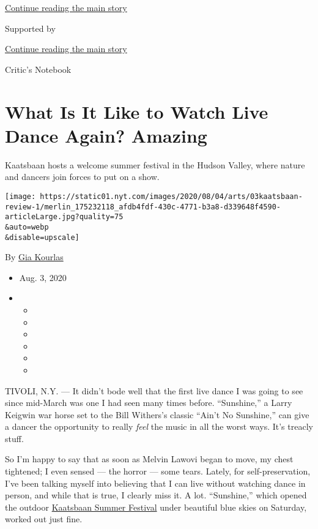 \protect\hyperlink{after-top}{Continue reading the main story}

Supported by

\protect\hyperlink{after-sponsor}{Continue reading the main story}

Critic's Notebook

\hypertarget{what-is-it-like-to-watch-live-dance-again-amazing}{%
\section{What Is It Like to Watch Live Dance Again?
Amazing}\label{what-is-it-like-to-watch-live-dance-again-amazing}}

Kaatsbaan hosts a welcome summer festival in the Hudson Valley, where
nature and dancers join forces to put on a show.

\texttt{[image: https://static01.nyt.com/images/2020/08/04/arts/03kaatsbaan-review-1/merlin\_175232118\_afdb4fdf-430c-4771-b3a8-d339648f4590-articleLarge.jpg?quality=75\\\&auto=webp\\\&disable=upscale]}

By \href{https://www.nytimes.com/by/gia-kourlas}{Gia Kourlas}

\begin{itemize}
\item
  Aug. 3, 2020
\item
  \begin{itemize}
  \item
  \item
  \item
  \item
  \item
  \item
  \end{itemize}
\end{itemize}

TIVOLI, N.Y. --- It didn't bode well that the first live dance I was
going to see since mid-March was one I had seen many times before.
``Sunshine,'' a Larry Keigwin war horse set to the Bill Withers's
classic ``Ain't No Sunshine,'' can give a dancer the opportunity to
really \emph{feel} the music in all the worst ways. It's treacly stuff.

So I'm happy to say that as soon as Melvin Lawovi began to move, my
chest tightened; I even sensed --- the horror --- some tears. Lately,
for self-preservation, I've been talking myself into believing that I
can live without watching dance in person, and while that is true, I
clearly miss it. A lot. ``Sunshine,'' which opened the outdoor
\href{https://www.nytimes.com/2020/07/29/arts/dance/kaatsbaan-dance-festival-stella-abrera.html}{Kaatsbaan
Summer Festival} under beautiful blue skies on Saturday, worked out just
fine.

